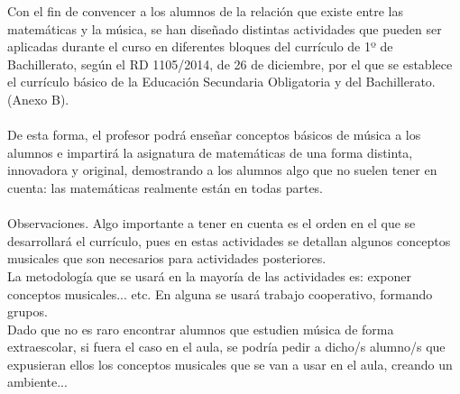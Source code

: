 \documentclass[a4paper, openright, 11pt, titlepage]{report}
\theoremstyle{definition}\newtheorem{defin}[propo]{Definition}
\theoremstyle{definition}\newtheorem{obser}[propo]{Remark}
\theoremstyle{definition}\newtheorem{ejem}[propo]{Ejemplo}
\theoremstyle{definition}\newtheorem{algoritmo}[propo]{Algoritmo}
\begin{document}
Con el fin de convencer a los alumnos de la relación que existe entre las matemáticas y la música, se han diseñado distintas actividades que pueden ser aplicadas durante el curso en diferentes bloques del currículo de 1º de Bachillerato, según el RD 1105/2014, de 26 de diciembre, por el que se establece el currículo básico de la Educación Secundaria Obligatoria y del Bachillerato. (Anexo B).\\\\
De esta forma, el profesor podrá enseñar conceptos básicos de música a los alumnos e impartirá la asignatura de matemáticas de una forma distinta, innovadora y original, demostrando a los alumnos algo que no suelen tener en cuenta: las matemáticas realmente están en todas partes.\\\\
Observaciones. Algo importante a tener en cuenta es el orden en el que se desarrollará el currículo, pues en estas actividades se detallan algunos conceptos musicales que son necesarios para actividades posteriores.\\
La metodología que se usará en la mayoría de las actividades es: exponer conceptos musicales... etc. En alguna se usará trabajo cooperativo, formando grupos. \\
Dado que no es raro encontrar alumnos que estudien música de forma extraescolar, si fuera el caso en el aula, se podría pedir a dicho/s alumno/s que expusieran ellos los conceptos musicales que se van a usar en el aula, creando un ambiente...

\end{document}

